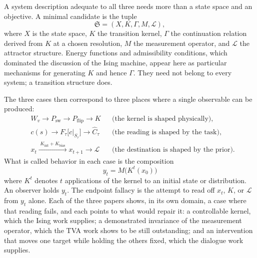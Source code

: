 \documentclass[11pt]{article}
\theoremstyle{definition}
\theoremstyle{remark}
\begin{document}
A system description adequate to all three needs more than a state space and an objective. A minimal candidate is the tuple
\begin{equation}
\mathfrak{S} = (X, K, \Gamma, M, \mathcal{L}),
\end{equation}
where $X$ is the state space, $K$ the transition kernel, $\Gamma$ the continuation relation derived from $K$ at a chosen resolution, $M$ the measurement operator, and $\mathcal{L}$ the attractor structure. Energy functions and admissibility conditions, which dominated the discussion of the Ising machine, appear here as particular mechanisms for generating $K$ and hence $\Gamma$. They need not belong to every system; a transition structure does.

The three cases then correspond to three places where a single observable can be produced:
\begin{align}
&W_v \longrightarrow P_{\mathrm{sw}} \longrightarrow P_{\mathrm{flip}} \longrightarrow K && \text{(the kernel is shaped physically)},\\
&c(s) \longrightarrow F_\tau\big[c|_{S_\tau}\big] \longrightarrow \hat{C}_\tau && \text{(the reading is shaped by the task)},\\
&x_t \xrightarrow{\;K_{\mathrm{int}} + K_{\mathrm{bias}}\;} x_{t+1} \longrightarrow \mathcal{L} && \text{(the destination is shaped by the prior)}.
\end{align}
What is called behavior in each case is the composition
\begin{equation}
\boxed{\, y_t = M\big(K^t(x_0)\big) \,}
\end{equation}
where $K^t$ denotes $t$ applications of the kernel to an initial state or distribution. An observer holds $y_t$. The endpoint fallacy is the attempt to read off $x_t$, $K$, or $\mathcal{L}$ from $y_t$ alone. Each of the three papers shows, in its own domain, a case where that reading fails, and each points to what would repair it: a controllable kernel, which the Ising work supplies; a demonstrated invariance of the measurement operator, which the TVA work shows to be still outstanding; and an intervention that moves one target while holding the others fixed, which the dialogue work supplies.
\end{document}

